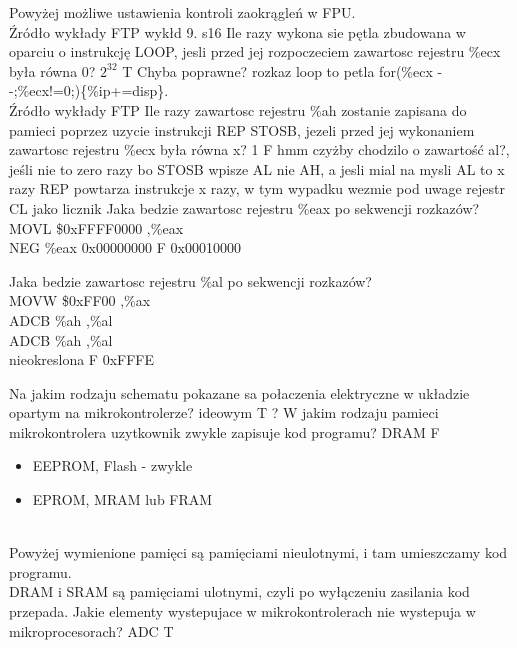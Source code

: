 {Powyżej możliwe ustawienia kontroli zaokrągleń w FPU. \\Źródło wykłady FTP wykłd 9. s16}
\answer
{Ile razy wykona sie pętla zbudowana w oparciu o instrukcję LOOP, jesli przed jej rozpoczeciem zawartosc rejestru \%ecx była równa 0? }
{$2^{32}$}
{T}
{Chyba poprawne?}
{rozkaz loop to petla for(\%ecx - -;\%ecx!=0;)\{\%ip+=disp\}. \\Źródło wykłady FTP}
\answer
{Ile razy zawartosc rejestru \%ah zostanie zapisana do pamieci poprzez uzycie instrukcji REP STOSB, jezeli przed jej wykonaniem zawartosc rejestru \%ecx była równa x?}
{1}
{F}
{hmm czyżby chodzilo o zawartość al?, jeśli nie to zero razy bo STOSB wpisze AL nie AH, a jesli mial na mysli AL to x razy}
{REP powtarza instrukcje x razy, w tym wypadku wezmie pod uwage rejestr CL jako licznik}
\answer
{
	Jaka bedzie zawartosc rejestru \%eax po sekwencji rozkazów?\\
	MOVL \$0xFFFF0000 ,\%eax\\
	NEG \%eax
}
{0x00000000}
{F}
{0x00010000}
{
	
}
\answer
{Jaka bedzie zawartosc rejestru \%al po sekwencji rozkazów? \\
	MOVW \$0xFF00 ,\%ax\\
	ADCB \%ah ,\%al\\
	ADCB \%ah ,\%al\\
	}
{nieokreslona}
{F}
{0xFFFE}
{
	
}
\answer
{Na jakim rodzaju schematu pokazane sa połaczenia elektryczne w układzie opartym na mikrokontrolerze?}
{ideowym}
{T}
{?}
{}
\answer
{W jakim rodzaju pamieci mikrokontrolera uzytkownik zwykle zapisuje kod programu?}
{DRAM}
{F}
{
	\begin{itemize}
		\item EEPROM, Flash - zwykle
		\item EPROM, MRAM lub FRAM
	\end{itemize}
}
\\{Powyżej wymienione pamięci są pamięciami nieulotnymi, i tam umieszczamy kod programu.\\DRAM i SRAM są pamięciami ulotnymi, czyli po wyłączeniu zasilania kod przepada.}
\answer
{Jakie elementy wystepujace w mikrokontrolerach nie wystepuja w mikroprocesorach?}
{ADC}
{T}
{}
